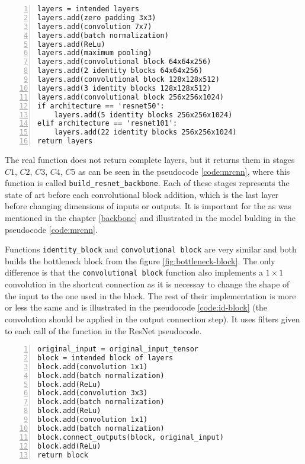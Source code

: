 {\scriptsize
\begin{lstlisting}[style=python, caption={Building the ResNet backbone architecture}, captionpos=b, label=code:resnet, deletekeywords={from, max},
backgroundcolor = \color{light-gray}, numbers=left, breaklines=true]
layers = intended layers
layers.add(zero padding 3x3)
layers.add(convolution 7x7)
layers.add(batch normalization)
layers.add(ReLu)
layers.add(maximum pooling)
layers.add(convolutional block 64x64x256)
layers.add(2 identity blocks 64x64x256)
layers.add(convolutional block 128x128x512)
layers.add(3 identity blocks 128x128x512)
layers.add(convolutional block 256x256x1024)
if architecture == 'resnet50':
    layers.add(5 identity blocks 256x256x1024)
elif architecture == 'resnet101':
    layers.add(22 identity blocks 256x256x1024)
return layers
\end{lstlisting}}

The real function does not return complete layers, but it returns them in stages $C1$, $C2$, $C3$, $C4$, $C5$ as can be seen in the pseudocode \ref{code:mrcnn}, where this function is called \verb|build_resnet_backbone|. Each of these stages represents the state of art before each convolutional block addition, which is the last layer before changing dimensions of inputs or outputs. It is important for the  as was mentioned in the chapter \ref{backbone} and illustrated in the model bulding in the pseudocode \ref{code:mrcnn}.

Functions \verb|identity_block| and \verb|convolutional block| are very similar and both builds the bottleneck block from the figure \ref{fig:bottleneck-block}. The only difference is that the \verb|convolutional block| function also implements a $1 \times 1$ convolution in the shortcut connection as it is necessay to change the shape of the input to the one used in the block. The rest of their implementation is more or less the same and is illustrated in the pseudocode \ref{code:id-block} (the convolution should be applied in the output connection step). It uses filters given to each call of the function in the ResNet pseudocode.

{\scriptsize
\begin{lstlisting}[style=python, caption={identity\_block}, captionpos=b, label=code:id-block, deletekeywords={from, input},
backgroundcolor = \color{light-gray}, numbers=left, breaklines=true]
original_input = original_input_tensor
block = intended block of layers
block.add(convolution 1x1)
block.add(batch normalization)
block.add(ReLu)
block.add(convolution 3x3)
block.add(batch normalization)
block.add(ReLu)
block.add(convolution 1x1)
block.add(batch normalization)
block.connect_outputs(block, original_input)
block.add(ReLu)
return block
\end{lstlisting}}

